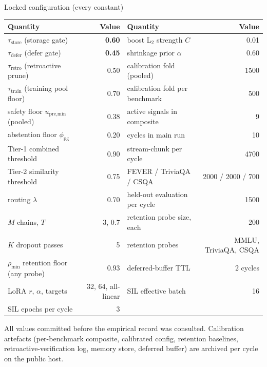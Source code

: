 \documentclass[10pt,aspectratio=169]{beamer}
\begin{document}
\begin{frame}{Locked configuration (every constant)}
  \scriptsize

  \begin{tabular}{@{}lr@{\quad}lr@{}}
    \toprule
    \textbf{Quantity} & \textbf{Value} & \textbf{Quantity} & \textbf{Value} \\
    \midrule
    $\tau_{\text{store}}$ (storage gate) & \textbf{0.60} & boost L$_2$ strength $C$ & 0.01 \\
    $\tau_{\text{defer}}$ (defer gate) & \textbf{0.45} & shrinkage prior $\alpha$ & 0.60 \\
    $\tau_{\text{retro}}$ (retroactive prune) & 0.50 & calibration fold (pooled) & 1500 \\
    $\tau_{\text{train}}$ (training pool floor) & 0.70 & calibration fold per benchmark & 500 \\
    safety floor $u_{\text{pre,min}}$ (pooled) & 0.38 & active signals in composite & 9 \\
    abstention floor $\phi_{\text{pg}}$ & 0.20 & cycles in main run & 10 \\
    Tier-1 combined threshold & 0.90 & stream-chunk per cycle & 4700 \\
    Tier-2 similarity threshold & 0.75 & \quad FEVER / TriviaQA / CSQA & 2000 / 2000 / 700 \\
    routing $\lambda$ & 0.70 & held-out evaluation per cycle & 1500 \\
    $M$ chains, $T$ & 3, 0.7 & retention probe size, each & 200 \\
    $K$ dropout passes & 5 & retention probes & MMLU, TriviaQA, CSQA \\
    $\rho_{\min}$ retention floor (any probe) & 0.93 & deferred-buffer TTL & 2 cycles \\
    LoRA $r$, $\alpha$, targets & 32, 64, all-linear & SIL effective batch & 16 \\
    SIL epochs per cycle & 3 & & \\
    \bottomrule
  \end{tabular}

  \vspace{0.4em}
  {\scriptsize All values committed before the empirical record was consulted. Calibration artefacts (per-benchmark composite, calibrated config, retention baselines, retroactive-verification log, memory store, deferred buffer) are archived per cycle on the public host.}
\end{frame}
\end{document}
